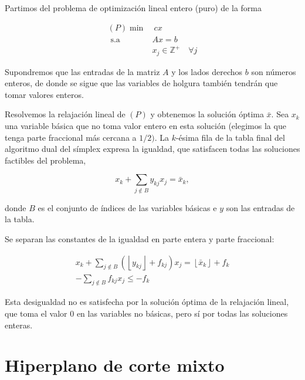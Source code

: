 \documentclass[openany]{book}
\begin{document}
Partimos del problema de optimización lineal entero (puro) de la forma

$$
\begin{aligned}
(P) \min &\ c x \\
\text { s.a } & A x=b \\
& x_{j} \in \mathbb{Z}^{+} \quad \forall j
\end{aligned}
$$

Supondremos que las entradas de la matriz $A$ y los lados derechos $b$ son números enteros, de donde se sigue que las variables de holgura también tendrán que tomar valores enteros.

Resolvemos la relajación lineal de $(P)$ y obtenemos la solución óptima $\bar{x}$. Sea $x_{k}$ una variable básica que no toma valor entero en esta solución (elegimos la que tenga parte fraccional más cercana a $1 / 2)$. La $k$-ésima fila de la tabla final del algoritmo dual del símplex expresa la igualdad, que satisfacen todas las soluciones factibles del problema,

$$
x_{k}+\sum_{j \notin B} y_{k j} x_{j}=\bar{x}_{k},
$$

donde $B$ es el conjunto de índices de las variables básicas e $y$ son las entradas de la tabla.

Se separan las constantes de la igualdad en parte entera y parte fraccional:

$$
\begin{gathered}
x_{k}+\sum_{j \notin B}\left(\left\lfloor y_{k j}\right\rfloor+f_{k j}\right) x_{j}=\left\lfloor\bar{x}_{k}\right\rfloor+f_{k} \\
-\sum_{j \notin B} f_{k j} x_{j} \leq-f_{k}
\end{gathered}
$$

Esta desigualdad no es satisfecha por la solución óptima de la relajación lineal, que toma el valor 0 en las variables no básicas, pero sí por todas las soluciones enteras.


\section{Hiperplano de corte mixto}
\end{document}
